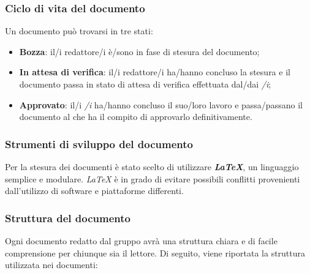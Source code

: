 		\subsubsection{Ciclo di vita del documento}
		Un documento può trovarsi in tre stati:
		\begin{itemize}
			\item \textbf{Bozza}: il/i redattore/i è/sono in fase di stesura del documento;
			\item \textbf{In attesa di verifica}: il/i redattore/i ha/hanno concluso la stesura e il documento passa in stato di attesa di verifica effettuata dal/dai \textit{\Ver/i};
			\item \textbf{Approvato}: il/i \textit{\Ver/i} ha/hanno concluso il suo/loro lavoro e passa/passano il documento al \textit{\RdP} che ha il compito di approvarlo definitivamente.
		\end{itemize}
		
		\subsubsection{Strumenti di sviluppo del documento}
		Per la stesura dei documenti è stato scelto di utilizzare \textbf{\textit{\LaTeX{}}}, un linguaggio semplice e modulare. \textit{\LaTeX{}} è in grado di evitare possibili conflitti provenienti dall’utilizzo di software e piattaforme differenti.
	
		\subsubsection{Struttura del documento}
		Ogni documento redatto dal gruppo avrà una struttura chiara e di facile comprensione per chiunque sia il lettore. Di seguito, viene riportata la struttura utilizzata nei documenti:

